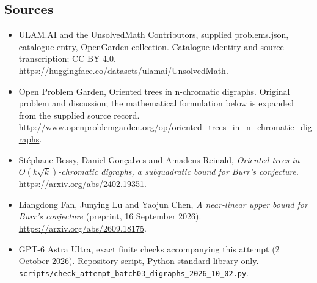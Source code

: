 \documentclass[11pt,a4paper]{article}
\begin{document}
\subsection{Sources}
\begin{itemize}
\item[S1] ULAM.AI and the UnsolvedMath Contributors, supplied problems.json, catalogue entry, OpenGarden collection. Catalogue identity and source transcription; CC BY 4.0.
\url{https://huggingface.co/datasets/ulamai/UnsolvedMath}.
\item[S2] Open Problem Garden, Oriented trees in n-chromatic digraphs. Original problem and discussion; the mathematical formulation below is expanded from the supplied source record.
\url{http://www.openproblemgarden.org/op/oriented_trees_in_n_chromatic_digraphs}.
\item[S3] St\'ephane Bessy, Daniel Gon\c calves and Amadeus Reinald, \emph{Oriented trees in $O(k\sqrt{k})$-chromatic digraphs, a subquadratic bound for Burr's conjecture}. \url{https://arxiv.org/abs/2402.19351}.
\item[S4] Liangdong Fan, Junying Lu and Yaojun Chen, \emph{A near-linear upper bound for Burr's conjecture} (preprint, 16 September 2026). \url{https://arxiv.org/abs/2609.18175}.
\item[S9] GPT-6 Astra Ultra, exact finite checks accompanying this attempt (2 October 2026). Repository script, Python standard library only. \texttt{scripts/check\_attempt\_batch03\_digraphs\_2026\_10\_02.py}.
\end{itemize}
\end{document}
